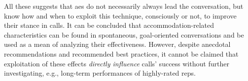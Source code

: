 All these suggests that \acp{ae} do not necessarily always lead the conversation, but know how and when to exploit this technique, consciously or not, to improve their stance in calls.
It can be concluded that accommodation-related characteristics can be found in spontaneous, goal-oriented conversations and be used as a mean of analyzing their effectiveness.
However, despite anecdotal recommendations and recommended best practices, it cannot be claimed that exploitation of these effects \emph{directly influence} calls' success without further investigating, e.g., long-term performances of highly-rated reps.


